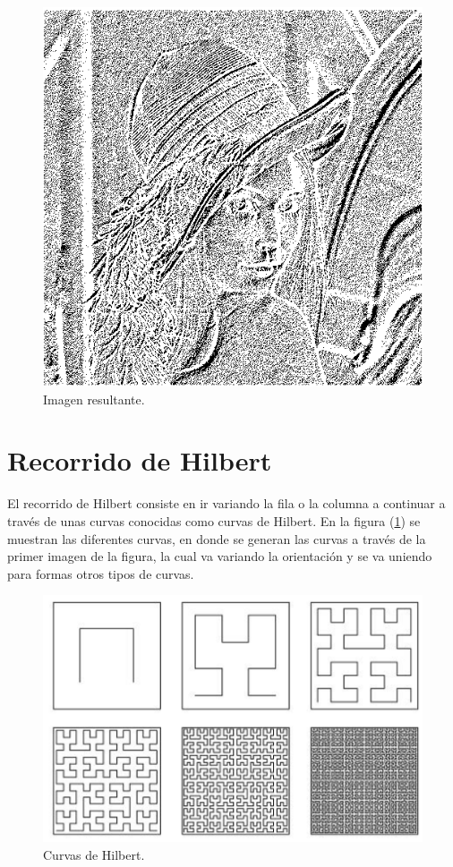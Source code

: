 \begin{figure}[H]
	\centering
	\includegraphics[scale=0.5]{imagenes/sumaRecorido.png}

	\caption{Imagen resultante.}
\end{figure}

\section{Recorrido de Hilbert}

El recorrido de Hilbert consiste en ir variando la fila o la columna a continuar a través de unas curvas conocidas como curvas de Hilbert. En la figura (\ref{fig:curvas-Hilbert}) se muestran las diferentes curvas, en donde se generan las curvas a través de la primer imagen de la figura, la cual va variando la orientación y se va uniendo para formas otros tipos de curvas.

\begin{figure}[H]
	\centering
	\includegraphics[scale=0.5]{imagenes/curvasHilbert.png}

	\caption{Curvas de Hilbert\label{fig:curvas-Hilbert}.}
\end{figure}

